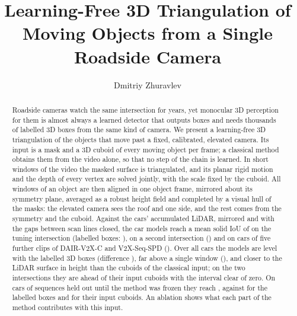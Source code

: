 \documentclass[runningheads,a4paper]{llncs}
\begin{document}
\title{Learning-Free 3D Triangulation of Moving Objects from a Single Roadside Camera}
\author{Dmitriy Zhuravlev}

\maketitle

\begin{abstract}
Roadside cameras watch the same intersection for years, yet monocular 3D perception for them is almost always a
learned detector that outputs boxes and needs thousands of labelled 3D boxes from the same kind of camera. We present
a learning-free 3D triangulation of the objects that move past a fixed, calibrated, elevated camera. Its input is a
mask and a 3D cuboid of every moving object per frame; a classical method obtains them from the video alone, so that no step of the chain is learned. In short windows
of the video the masked surface is triangulated, and its planar rigid motion and the depth of every vertex are solved
jointly, with the scale fixed by the cuboid. All windows of an object are then aligned in one object frame,
mirrored about its symmetry plane, averaged as a robust height field and completed by a visual hull of the masks: the
elevated camera sees the roof and one side, and the rest comes from the symmetry and the cuboid. Against the cars' accumulated LiDAR, mirrored and with the gaps between scan lines closed, the car models reach a
mean solid IoU of \ClsAOurs{} on the tuning intersection (labelled boxes: \ClsALab{}), \ClsBOurs{} on a second
intersection (\ClsBLab{}) and \ClsFOurs{} on \ClsFCars{} cars of five further clips of DAIR-V2X-C and V2X-Seq-SPD
(\ClsFLab{}). Over all \ClsTCars{} cars the models are level with the labelled 3D boxes (difference \ClsTDLab{}), far above a
single window (\ClsTSingle{}), and closer to the LiDAR surface in height than the cuboids of the classical input; on the two intersections they are ahead of their input cuboids with the interval clear of zero. On \ClsHCars{} cars of sequences held out until the method was frozen they reach \ClsHOurs{}, against \ClsHLab{} for the labelled boxes and \ClsHInput{} for their input cuboids. An ablation shows what each part of the method contributes with this input.
\end{abstract}
\end{document}
